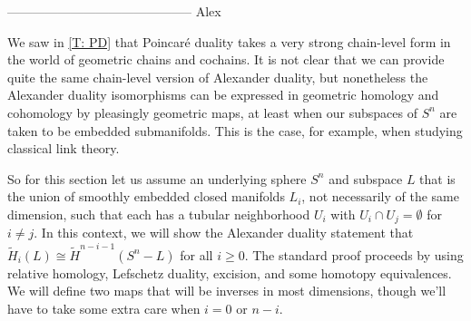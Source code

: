 \documentclass[12pt]{article}
\theoremstyle{plain}
\theoremstyle{definition}
\theoremstyle{remark}
\newcommand{\td}[1]{\tilde{#1}}
\newcommand{\Z}{\mathbb{Z}}
\newcommand{\mc}[1]{\mathcal{#1}}
\begin{document}
\begin{comment}
So if we write the generators of $H^2_\Gamma(\amalg(U_a-L_a))$ as $x_a$ and choose consistent co-orientations, we see that, possibly up to a universal sign, $j(\underline{\hat \gamma_{ab}}) = x_a - x_b$.
Now let us order our indexing set $A$ and relabel $A = \{1, \ldots , n\}$.
We then have that the set $\mc G = \{\underline{\hat \gamma_{i,i+1}}\}_{i=1}^{n-1}$ maps onto the set $\{x_i-x_{i+1}\}_{i=1}^{n-1}$, which spans a subgroups of $H^2_\Gamma(\amalg(U_a-L_a))$ such that the quotient is $\Z$.
Thus the elements of $\mc G$ generate $H^2_\Gamma(M) \cong \Z^{n-1}$.
We also see from the exact sequence that $\underline{\hat \gamma_{i,i+1}}+\underline{\hat \gamma_{i+1,i+2}} = \underline{\hat \gamma_{i, i+2}}$, as their difference maps to $0$, but $j$ is injective.
More generally, $\underline{\hat \gamma_{i,i+1}} + \cdots + \underline{\hat \gamma_{i+k-1, i+k}} =\underline{\hat \gamma_{i,i+k}}$.

So, in summary, the generators of $H^1_\Gamma(M)$ can be represented by Seifert surfaces, while the elements of $H^2_\gamma(M)$ can be realized as arcs between neighboring components, subject to the above relations.

Of course the real power of geometric cohomology is that we can also derive consequences for the \emph{ring} $H^*_\Gamma(M)$ from geometry.
For example, if it is possible to choose Seifert surfaces $S_a$ simultaneously that are disjoint or intersect only in closed curves, then all cup product on $H^1_\Gamma(M)$ vanish.
On the other hand, if two Seifert surfaces $S_a$ and $S_b$ intersect in just an arc between $L_a$ and $L_b$, then this corresponds to the cup product of two generators of $H^1_\Gamma(M)$ being a generator of $H^2_\Gamma(M)$.
\end{comment}


--------------------------------------------
Alex

We saw in \cref{T: PD} that Poincar\'e duality takes a very strong chain-level form in the world of geometric chains and cochains.
It is not clear that we can provide quite the same chain-level version of Alexander duality, but nonetheless the Alexander duality isomorphisms can be expressed in geometric homology and cohomology by pleasingly geometric maps, at least when our subspaces of $S^n$ are taken to be embedded submanifolds.
This is the case, for example, when studying classical link theory.

So for this section let us assume an underlying sphere $S^n$ and subspace $L$ that is the union of smoothly embedded closed manifolds $L_i$, not necessarily of the same dimension, such that each has a tubular neighborhood $U_i$ with $U_i \cap U_j = \emptyset$ for $i \neq j$.
In this context, we will show the Alexander duality statement that $\td H_i(L) \cong \td H^{n-i-1}(S^n-L)$ for all $i \geq 0$.
The standard proof proceeds by using relative homology, Lefschetz duality, excision, and some homotopy equivalences. We will define two maps that will be inverses in most dimensions, though we'll have to take some extra care when $i=0$ or $n-i$.
\end{document}
